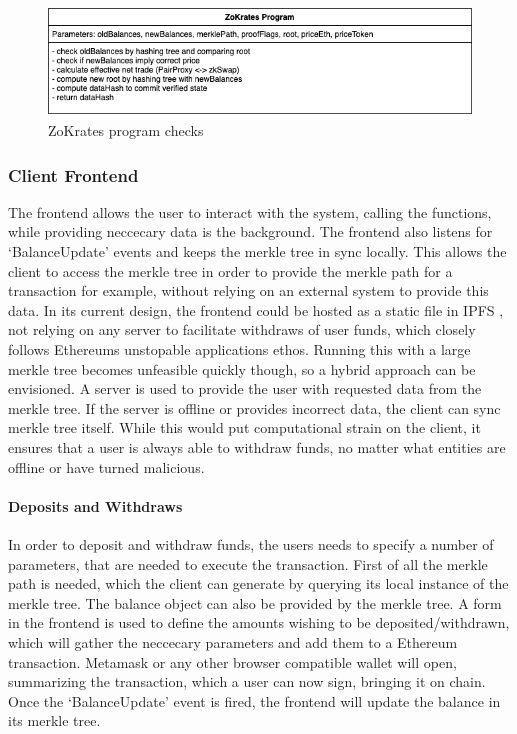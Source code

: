 \documentclass[../../thesis.tex]{subfiles}
\begin{document}
\begin{figure}[h]
    \centerline{\includegraphics[totalheight=3cm]{diagrams/zokrates.png}}
    \caption{ZoKrates program checks}
    \label{fig:zokrates}
\end{figure}

\subsubsection{Client Frontend}
The frontend allows the user to interact with the system, calling the functions, while providing neccecary data is the background. The frontend also listens for `BalanceUpdate' events and keeps the merkle tree in sync locally. This allows the client to access the merkle tree in order to provide the merkle path for a transaction for example, without relying on an external system to provide this data. In its current design, the frontend could be hosted as a static file in IPFS \cite{benet2014ipfs}, not relying on any server to facilitate withdraws of user funds, which closely follows Ethereums unstopable applications ethos. Running this with a large merkle tree becomes unfeasible quickly though, so a hybrid approach can be envisioned. A server is used to provide the user with requested data from the merkle tree. If the server is offline or provides incorrect data, the client can sync merkle tree itself. While this would put computational strain on the client, it ensures that a user is always able to withdraw funds, no matter what entities are offline or have turned malicious. 

\paragraph{Deposits and Withdraws}
In order to deposit and withdraw funds, the users needs to specify a number of parameters, that are needed to execute the transaction. First of all the merkle path is needed, which the client can generate by querying its local instance of the merkle tree. The balance object can also be provided by the merkle tree. A form in the frontend is used to define the amounts wishing to be deposited/withdrawn, which will gather the neccecary parameters and add them to a Ethereum transaction. Metamask or any other browser compatible wallet will open, summarizing the transaction, which a user can now sign, bringing it on chain. Once the `BalanceUpdate' event is fired, the frontend will update the balance in its merkle tree.
\end{document}
